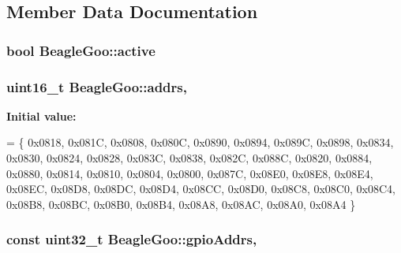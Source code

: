 \subsection{Member Data Documentation}
\hypertarget{struct_beagle_goo_a64e92bad467b29cb868bec64d1f6be6f}{
\subsubsection[{active}]{\setlength{\rightskip}{0pt plus 5cm}bool Beagle\-Goo\-::active\hspace{0.3cm}{\ttfamily [protected]}}}\label{struct_beagle_goo_a64e92bad467b29cb868bec64d1f6be6f}
\hypertarget{struct_beagle_goo_a13b31f0a40c07bd0ca8c9d9fa51ae60a}{
\subsubsection[{addrs}]{\setlength{\rightskip}{0pt plus 5cm}uint16\-\_\-t Beagle\-Goo\-::addrs\hspace{0.3cm}{\ttfamily [static]}, {\ttfamily [protected]}}}\label{struct_beagle_goo_a13b31f0a40c07bd0ca8c9d9fa51ae60a}
{\bfseries Initial value\-:}
\begin{DoxyCode}
=
        \{ 0x0818, 0x081C, 0x0808,                       
                        0x080C, 0x0890, 0x0894, 0x089C, 0x0898, 
                        0x0834, 0x0830, 0x0824, 0x0828, 0x083C, 
                        0x0838, 0x082C, 0x088C, 0x0820, 0x0884, 
                        0x0880, 0x0814, 0x0810, 0x0804, 0x0800, 
                        0x087C, 0x08E0, 0x08E8, 0x08E4, 0x08EC, 
                        0x08D8, 0x08DC, 0x08D4, 0x08CC, 0x08D0, 
                        0x08C8, 0x08C0, 0x08C4, 0x08B8, 0x08BC, 
                        0x08B0, 0x08B4, 0x08A8, 0x08AC, 0x08A0, 
                        0x08A4                                  
                \}
\end{DoxyCode}
\hypertarget{struct_beagle_goo_a709c4761b20d2db44096036573d3285f}{
\subsubsection[{gpio\-Addrs}]{\setlength{\rightskip}{0pt plus 5cm}const uint32\-\_\-t Beagle\-Goo\-::gpio\-Addrs\hspace{0.3cm}{\ttfamily [static]}, {\ttfamily [protected]}}}\label{struct_beagle_goo_a709c4761b20d2db44096036573d3285f}
